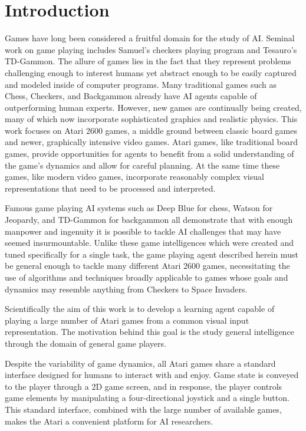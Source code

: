\documentclass{acm_proc_article-sp}
\begin{document}


\section{Introduction}
Games have long been considered a fruitful domain for the study of AI. Seminal work on game playing includes Samuel's checkers playing program\cite{samuel_59} and Tesauro's TD-Gammon\cite{tesauro_94}. The allure of games lies in the fact that they represent problems challenging enough to interest humans yet abstract enough to be easily captured and modeled inside of computer programs. Many traditional games such as Chess, Checkers, and Backgammon already have AI agents capable of outperforming human experts. However, new games are continually being created, many of which now incorporate sophisticated graphics and realistic physics. This work focuses on Atari 2600 games, a middle ground between classic board games and newer, graphically intensive video games. Atari games, like traditional board games, provide opportunities for agents to benefit from a solid understanding of the game's dynamics and allow for careful planning. At the same time these games, like modern video games, incorporate reasonably complex visual representations that need to be processed and interpreted.

Famous game playing AI systems such as Deep Blue for chess, Watson for Jeopardy, and TD-Gammon for backgammon all demonstrate that with enough manpower and ingenuity it is possible to tackle AI challenges that may have seemed insurmountable. Unlike these game intelligences which were created and tuned specifically for a single task, the game playing agent described herein must be general enough to tackle many different Atari 2600 games, necessitating the use of algorithms and techniques broadly applicable to games whose goals and dynamics may resemble anything from Checkers to Space Invaders. 

Scientifically the aim of this work is to develop a learning agent capable of playing a large number of Atari games from a common visual input representation. The motivation behind this goal is the study general intelligence through the domain of general game players. 

Despite the variability of game dynamics, all Atari games share a standard interface designed for humans to interact with and enjoy. Game state is conveyed to the player through a 2D game screen, and in response, the player controls game elements by manipulating a four-directional joystick and a single button. This standard interface, combined with the large number of available games, makes the Atari a convenient platform for AI researchers. 
\end{document}

